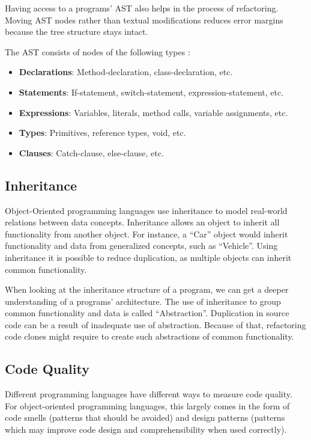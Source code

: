 Having access to a programs' AST also helps in the process of refactoring. Moving AST nodes rather than textual modifications reduces error margins because the tree structure stays intact.

The AST consists of nodes of the following types \cite{tomassetti2017javaparser}:
\begin{itemize}
  \item \textbf{Declarations}: Method-declaration, class-declaration, etc.
  \item \textbf{Statements}: If-statement, switch-statement, expression-statement, etc.
  \item \textbf{Expressions}: Variables, literals, method calls, variable assignments, etc.
  \item \textbf{Types}: Primitives, reference types, void, etc.
  \item \textbf{Clauses}: Catch-clause, else-clause, etc.
\end{itemize}

\subsection{Inheritance}
Object-Oriented programming languages use inheritance to model real-world relations between data concepts. Inheritance allows an object to inherit all functionality from another object. For instance, a ``Car'' object would inherit functionality and data from generalized concepts, such as ``Vehicle''. Using inheritance it is possible to reduce duplication, as multiple objects can inherit common functionality.

When looking at the inheritance structure of a program, we can get a deeper understanding of a programs' architecture. The use of inheritance to group common functionality and data is called ``Abstraction''. Duplication in source code can be a result of inadequate use of abstraction. Because of that, refactoring code clones might require to create such abstractions of common functionality.

\subsection{Code Quality}
Different programming languages have different ways to measure code quality. For object-oriented programming languages, this largely comes in the form of code smells (patterns that should be avoided) and design patterns (patterns which may improve code design and comprehensibility when used correctly).

